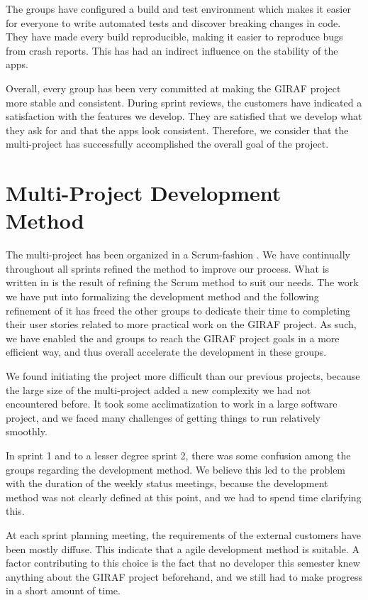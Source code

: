 The \bd{} groups have configured a build and test environment which makes it easier for everyone to write automated tests and discover breaking changes in code. They have made every build reproducible, making it easier to reproduce bugs from crash reports. This has had an indirect influence on the stability of the apps.

Overall, every group has been very committed at making the GIRAF project more stable and consistent. During sprint reviews, the customers have indicated a satisfaction with the features we develop. They are satisfied that we develop what they ask for and that the apps look consistent. Therefore, we consider that the multi-project has successfully accomplished the overall goal of the project.

\section{Multi-Project Development Method}\label{conc:multi_project_process_eval}
The multi-project has been organized in a Scrum-fashion . We have continually throughout all sprints refined the method to improve our process. What is written in  is the result of refining the Scrum method to suit our needs. The work we have put into formalizing the development method and the following refinement of it has freed the other groups to dedicate their time to completing their user stories related to more practical work on the GIRAF project. As such, we have enabled the \gui and \db groups to reach the GIRAF project goals in a more efficient way, and thus overall accelerate the development in these groups.

We found initiating the project more difficult than our previous projects, because the large size of the multi-project added a new complexity we had not encountered before. It took some acclimatization to work in a large software project, and we faced many challenges of getting things to run relatively smoothly.  

In sprint 1 and to a lesser degree sprint 2, there was some confusion among the groups regarding the development method. We believe this led to the problem with the duration of the weekly status meetings, because the development method was not clearly defined at this point, and we had to spend time clarifying this. 

At each sprint planning meeting, the requirements of the external customers have been mostly diffuse. This indicate that a agile development method is suitable. A factor contributing to this choice is the fact that no developer this semester knew anything about the GIRAF project beforehand, and we still had to make progress in a short amount of time.

